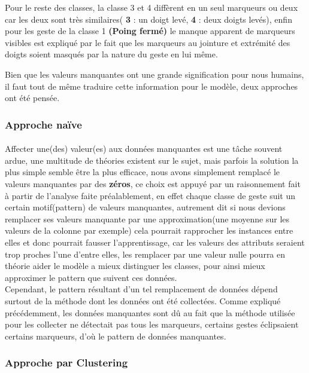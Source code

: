 Pour le reste des classes, la classe 3 et 4 diffèrent en un seul marqueurs ou deux car les deux sont très similaires( \textbf{3} : un doigt levé, \textbf{4} : deux doigts levés), enfin pour les geste de la classe 1 \textbf{(Poing fermé)} le manque apparent de marqueurs visibles est expliqué par le fait que les marqueurs au jointure et extrémité des doigts soient masqués par la nature du geste en lui même.\par 
Bien que les valeurs manquantes ont une grande signification pour nous humains, il faut tout de même traduire cette information pour le modèle, deux approches ont été pensée.
\subsubsection{Approche naïve}\label{naiveApproache}
\paragraph{}
Affecter une(des) valeur(es) aux données manquantes est une tâche souvent ardue, une multitude de théories existent sur le sujet, mais parfois la solution la plus simple semble être la plus efficace, nous avons simplement remplacé le valeurs manquantes par des \textbf{zéros}, ce choix est appuyé par un raisonnement fait à partir de l'analyse faite préalablement, en effet chaque classe de geste suit un certain motif(pattern) de valeurs manquantes, autrement dit si nous devions remplacer ses valeurs manquante par une approximation(une moyenne sur les valeurs de la colonne par exemple) cela pourrait rapprocher les instances entre elles et donc pourrait fausser l'apprentissage, car les valeurs des attributs seraient trop proches l'une d'entre elles, les remplacer par une valeur nulle pourra en théorie aider le modèle a mieux distinguer les classes, pour ainsi mieux approximer le pattern que suivent ces données.\\
Cependant, le pattern résultant d’un tel remplacement de données dépend surtout de la méthode dont les données ont été collectées. Comme expliqué précédemment, les données manquantes sont dû au fait que la méthode utilisée pour les collecter ne détectait pas tous les marqueurs, certains gestes éclipsaient certains marqueurs, d’où le pattern de données manquantes.	
\subsubsection{Approche par Clustering}\label{clusterApproache}

